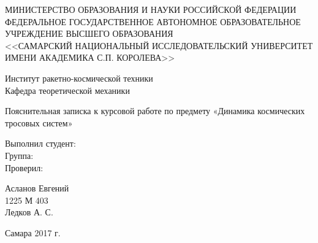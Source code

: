 \begin{titlepage}
\begin{center}
\vspace{1.5em}
МИНИСТЕРСТВО ОБРАЗОВАНИЯ И НАУКИ РОССИЙСКОЙ ФЕДЕРАЦИИ\\
\vspace{\baselineskip}
ФЕДЕРАЛЬНОЕ ГОСУДАРСТВЕННОЕ АВТОНОМНОЕ ОБРАЗОВАТЕЛЬНОЕ\\
УЧРЕЖДЕНИЕ ВЫСШЕГО ОБРАЗОВАНИЯ\\
<<САМАРСКИЙ НАЦИОНАЛЬНЫЙ ИССЛЕДОВАТЕЛЬСКИЙ УНИВЕРСИТЕТ\\
ИМЕНИ АКАДЕМИКА С.П. КОРОЛЕВА>>\\
\vspace{\baselineskip}
\end{center}
\begin{center}
  {Институт ракетно-космической техники}\\
  \vspace{\baselineskip}
  {Кафедра теоретической механики}
\end{center}
\vspace{64pt}
\begin{center}
Пояснительная записка к курсовой работе по предмету «Динамика космических тросовых систем»\\
\end{center}
\vspace{64pt}
\begin{minipage}{0.4\linewidth}
  \begin{flushleft}
    {Выполнил студент:} \\
    {Группа:}\\
    {Проверил:}\\
    \hspace{1pt}
    \end{flushleft}
  \end{minipage} 
  \hfill
  \begin{minipage}{0.4\linewidth}
  \begin{flushright}
  Асланов Евгений\\
  1225 М 403\\
  Ледков А. С.\\
  \hspace{64pt}
  \end{flushright}
 \end{minipage}

\vspace{\fill}

\begin{center}
Самара 2017 г.
\end{center}
\end{titlepage}
